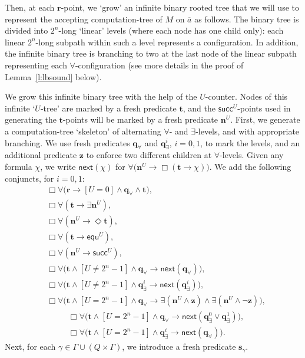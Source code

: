 \documentclass[10pt,a4paper]{amsart}
\theoremstyle{plain}
\theoremstyle{definition}
\newcommand{\fform}[1]{\boldsymbol{#1}}
\newcommand{\qvar}{\fform{q}}
\newcommand{\svar}{\fform{s}}
\newcommand{\Zvar}{\fform{z}}
\newcommand{\cU}{U}
\newcommand{\cvf}[3]{[{#1}\mathop{#2}{#3}]}
\newcommand{\inpw}{\overline{a}}
\newcommand{\nextU}{\fform{n}^\cU}
\newcommand{\Bv}{\forall}
\newcommand{\Bh}{\Box}
\newcommand{\Dv}{\exists}
\newcommand{\Dh}{\Diamond}
\newcommand{\start}{\fform{r}}
\newcommand{\nextt}[1]{\mathsf{next}({#1})}
\newcommand{\grid}{\mathsf{equ}}
\newcommand{\scc}{\mathsf{succ}}
\newcommand{\tree}{\fform{t}}
\newcommand{\qA}{\qvar_\forall}
\newcommand{\qE}{\qvar_\exists}
\begin{document}
	Then, at each $\start$-point, we `grow' an infinite binary rooted tree that we will use to represent the accepting computation-tree of $M$ on $\inpw$ as follows. The binary tree is divided into $2^n$-long `linear' levels
	(where each node has one child only): each linear $2^n$-long subpath within such a level represents a configuration.
	In addition, the infinite binary tree is branching to two at the last node of the linear subpath representing each $\forall$-configuration (see more details in the proof of Lemma~\ref{l:lbsound} below).
	
	We grow this infinite binary tree with the help of the $\cU$-counter.
	Nodes of this infinite `$\cU$-tree' are marked by a fresh predicate $\tree$, and
	the $\scc^\cU$-points used in generating the $\tree$-points will be marked by a fresh predicate $\nextU$.
	First, we generate a computation-tree `skeleton' of alternating $\forall$- and $\exists$-levels, and with appropriate branching. We use fresh predicates $\qA$ and $\qE^i$, $i=0,1$, to mark the levels, and an additional predicate $\Zvar$
	to enforce two different children at $\forall$-levels.
	Given any formula $\chi$, we write $\nextt{\chi}$ for
	$\Bv\bigl(\nextU\to\Bh(\tree\to\chi)\bigr)$. We add the following conjuncts, for $i=0,1$:
	\begin{align}
		\label{Utreefirst}
		& \Bh\Bv\bigl(\start\to \cvf{\cU}{=}{0}\land\qA\land\tree\bigr),\\
		& \Bh\Bv (\tree\to \Dv\nextU),\\
		& \Bh\Bv (\nextU\to\Dh\tree),\\
		& \Bh\Bv(\tree\to\grid^\cU),\\
		& \Bh\Bv(\nextU\to\scc^\cU),\\
		& \Bh\Bv\bigl(\tree\land \cvf{\cU}{\ne}{2^n-1}\land\qA\to\nextt{\qA}\bigr),\\
		& \Bh\Bv\bigl(\tree\land \cvf{\cU}{\ne}{2^n-1}\land\qE^i\to\nextt{\qE^i}\bigr),\\
		& \Bh\Bv\bigl(\tree\land \cvf{\cU}{=}{2^n-1}\land\qA 
		\to\Dv(\nextU\land\Zvar)\land\Dv(\nextU\land\neg\Zvar)\bigr),%
	\end{align}
%	
	\begin{align}
		& \Bh\Bv\bigl(\tree\land\cvf{\cU}{=}{2^n-1}\land\qA\to\nextt{\qE^0\lor\qE^1}\bigr),\\
		\label{Utreelast}
		& \Bh\Bv\bigl(\tree\land\cvf{\cU}{=}{2^n-1}\land\qE^i\to\nextt{\qA}\bigr).
	\end{align}
	Next, for each $\gamma\in\Gamma\cup(Q\times\Gamma)$, we introduce a fresh predicate $\svar_\gamma$. 
\end{document}
